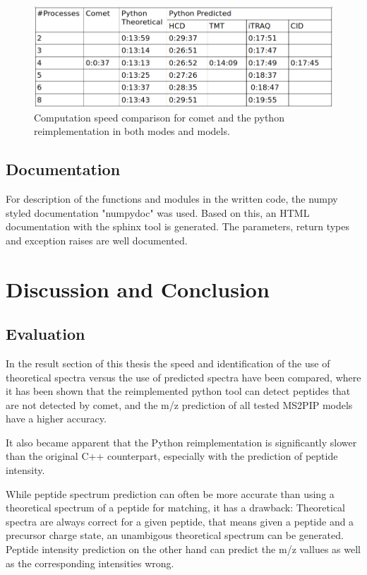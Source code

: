\documentclass[11pt]{article}
\begin{document}
\begin{figure}[ht]
\centering
\includegraphics[width=1\textwidth]{figs/speed-comparison.png}
\caption{Computation speed comparison for comet and the python reimplementation in both modes and models.}
\label{fig:speed-comparison}
\end{figure}

\subsection{Documentation}
For description of the functions and modules in the written code, the numpy styled documentation "numpydoc" was used. Based on this, an HTML documentation with the sphinx tool is generated. The parameters, return types and exception raises are well documented.

\section{Discussion and Conclusion}
\subsection{Evaluation}
In the result section of this thesis the speed and identification of the use of theoretical spectra versus the use of predicted spectra have been compared, where it has been shown that the reimplemented python tool can detect peptides that are not detected by comet, and the m/z prediction of all tested MS2PIP models have a higher accuracy.

It also became apparent that the Python reimplementation is significantly slower than the original C++ counterpart, especially with the prediction of peptide intensity.

While peptide spectrum prediction can often be more accurate than using a theoretical spectrum of a peptide for matching,
it has a drawback: Theoretical spectra are always correct for a given peptide, that means given a peptide and a precursor charge state, an unambigous theoretical spectrum can be generated. Peptide intensity prediction on the other hand can predict the m/z vallues as well as the corresponding intensities wrong.
\end{document}
